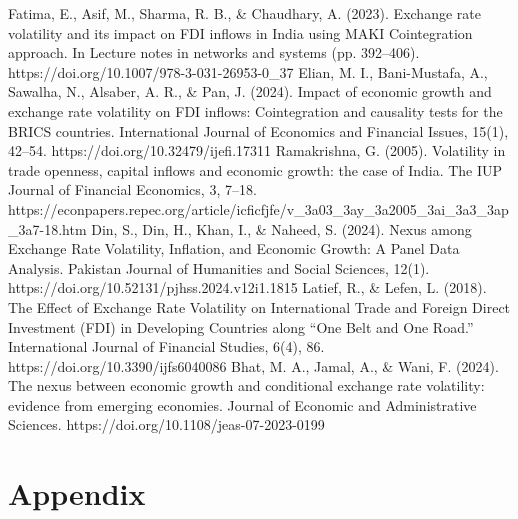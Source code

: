 \documentclass{article} %
\begin{document}
\begin{thebibliography}{9}
     Fatima, E., Asif, M., Sharma, R. B., \& Chaudhary, A. (2023). Exchange rate volatility and its impact on FDI inflows in India using MAKI Cointegration approach. In Lecture notes in networks and systems (pp. 392–406). https://doi.org/10.1007/978-3-031-26953-0\_37
     Elian, M. I., Bani-Mustafa, A., Sawalha, N., Alsaber, A. R., \& Pan, J. (2024). Impact of economic growth and exchange rate volatility on FDI inflows: Cointegration and causality tests for the BRICS countries. International Journal of Economics and Financial Issues, 15(1), 42–54. https://doi.org/10.32479/ijefi.17311
     Ramakrishna, G. (2005). Volatility in trade openness, capital inflows and economic growth: the case of India. The IUP Journal of Financial Economics, 3, 7–18. https://econpapers.repec.org/article/icficfjfe/v\_3a03\_3ay\_3a2005\_3ai\_3a3\_3ap\_3a7-18.htm
     Din, S., Din, H., Khan, I., \& Naheed, S. (2024). Nexus among Exchange Rate Volatility, Inflation, and Economic Growth: A Panel Data Analysis. Pakistan Journal of Humanities and Social Sciences, 12(1). https://doi.org/10.52131/pjhss.2024.v12i1.1815
     Latief, R., \& Lefen, L. (2018). The Effect of Exchange Rate Volatility on International Trade and Foreign Direct Investment (FDI) in Developing Countries along “One Belt and One Road.” International Journal of Financial Studies, 6(4), 86. https://doi.org/10.3390/ijfs6040086
     Bhat, M. A., Jamal, A., \& Wani, F. (2024). The nexus between economic growth and conditional exchange rate volatility: evidence from emerging economies. Journal of Economic and Administrative Sciences. https://doi.org/10.1108/jeas-07-2023-0199
\end{thebibliography}

\newpage

\appendix

\section{Appendix}
\end{document}

